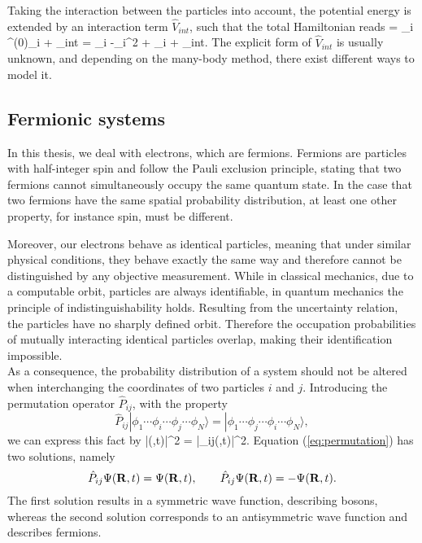 Taking the interaction between the particles into account, the potential energy is extended by an interaction term $\hat{V}_{int}$, such that the total Hamiltonian reads
\be 
{} = \sum_i ^{(0)}_i + _{int} = \sum_i \lb -\nabla_i^2 + _{i} \rb + _{int}.
\label{eq:hamiltonian}
\ee
The explicit form of $\hat{V}_{int}$ is usually unknown, and depending on the many-body method, there exist different ways to model it.

\subsection{Fermionic systems}
In this thesis, we deal with electrons, which are fermions. Fermions are particles with half-integer spin and follow the Pauli exclusion principle, stating that two fermions cannot simultaneously occupy the same quantum state. In the case that two fermions have the same spatial probability distribution, at least one other property, for instance spin, must be different.

Moreover, our electrons behave as identical particles, meaning that under similar physical conditions, they behave exactly the same way and therefore cannot be distinguished by any objective measurement. While in classical mechanics, due to a computable orbit, particles are always identifiable, in quantum mechanics the principle of indistinguishability holds.  Resulting from the uncertainty relation, the particles have no sharply defined orbit. Therefore the occupation probabilities of mutually interacting identical particles overlap, making their identification impossible.\\
As a consequence, the probability distribution of a system should not be altered when interchanging the coordinates of two particles $i$ and $j$. Introducing the permutation operator $\hat{P}_{ij}$, with the property
\[
\hat{P}_{ij}|\phi_1\cdots\phi_i\cdots\phi_j\cdots\phi_N\rangle = |\phi_1\cdots\phi_j\cdots\phi_i\cdots\phi_N\rangle,
\]
we can express this fact by
\be 
|\Psi(\rf,t)|^2 = |_{ij}\Psi(\rf,t)|^2.
\label{eq:permutation}
\ee 
Equation (\ref{eq:permutation}) has two solutions, namely
\[
\hat{P}_{ij}\Psi(\mathbf{R},t) = \Psi(\mathbf{R},t), \qquad \hat{P}_{ij}\Psi(\mathbf{R},t) = -\Psi(\mathbf{R},t).
\]
The first solution results in a symmetric wave function, describing bosons, whereas the second solution corresponds to an antisymmetric wave function and describes fermions.

